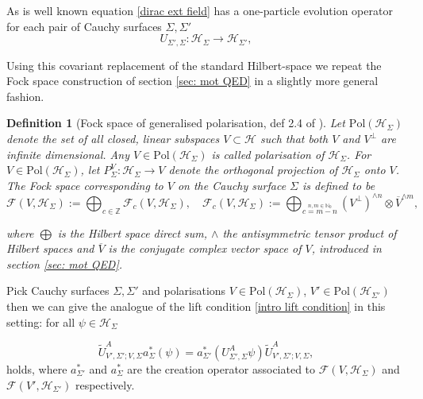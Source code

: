 \documentclass[b5paper,draft,openbib,12pt]{memoir}
\newtheorem{Def}{Definition}
\begin{document}
As is well known equation \eqref{dirac ext field} has a 
one-particle evolution operator for each pair of Cauchy surfaces \(\Sigma, \Sigma'\)
\begin{equation}
U_{\Sigma',\Sigma}:\mathcal{H}_\Sigma \rightarrow \mathcal{H}_{\Sigma'},
\end{equation}

Using this covariant replacement of the standard Hilbert-space we 
repeat the Fock space construction of section \ref{sec: mot QED} 
in a slightly more general fashion.

\begin{Def}[Fock space of generalised polarisation, def 2.4 of \cite{deckert2016perspective}]
  Let \(\text{Pol} (\mathcal{H}_\Sigma)\) denote the set of all 
  closed, linear subspaces \(V\subset \mathcal{H}\)
  such that both \(V\) and \(V^\perp\) are infinite dimensional. 
  Any \(V\in \text{Pol}(\mathcal{H}_\Sigma)\) is called 
  \emph{polarisation} of \(\mathcal{H}_\Sigma\). For 
  \(V\in \text{Pol}(\mathcal{H}_\Sigma)\), let 
  \(P_\Sigma^V:\mathcal{H}_{\Sigma}\rightarrow V\) 
  denote the orthogonal projection of \(\mathcal{H}_\Sigma\) onto 
  \(V\).
  The Fock space corresponding to \(V\) on the Cauchy surface 
  \(\Sigma\) is defined to be
  \begin{equation}
  \mathcal{F}(V,\mathcal{H}_\Sigma) := \bigoplus_{c\in\mathbb{Z}} \mathcal{F}_c (V,\mathcal{H}_\Sigma), \quad 
  \mathcal{F}_c(V,\mathcal{H}_\Sigma):= \bigoplus_{\overset{n,m\in\mathbb{N}_0}{c=m-n}}(V^\perp)^{\wedge n} \otimes \overline{V}^{\wedge m},
  \end{equation}
  
  where \(\bigoplus\) is the Hilbert space direct sum, \(\wedge\) 
  the antisymmetric tensor product of Hilbert spaces and 
  \(\overline{V}\) is the conjugate complex vector space of 
  \(V\), introduced in section \ref{sec: mot QED}.
\end{Def}

Pick Cauchy surfaces \(\Sigma, \Sigma'\) and polarisations 
\(V\in \text{Pol}(\mathcal{H}_\Sigma) \),
\(V'\in \text{Pol}(\mathcal{H}_{\Sigma'}) \)
then we can 
give the analogue of the lift condition  
\eqref{intro lift condition} in 
this setting: for all \(\psi \in \mathcal{H}_{\Sigma}\)

\begin{equation}\label{lift condition creation}
  \tilde{U}^A_{V',\Sigma'; V,\Sigma} a_\Sigma^*(\psi)
  =a^*_{\Sigma'}(U^A_{\Sigma',\Sigma}\psi )\tilde{U}^A_{V',\Sigma';V,\Sigma},
\end{equation}
holds, where \(a^*_{\Sigma'}\) and \(a^*_{\Sigma}\) are the 
creation operator associated to 
\(\mathcal{F}(V,\mathcal{H}_{\Sigma})\) and 
\(\mathcal{F}(V',\mathcal{H}_{\Sigma'})\) respectively. 
\end{document}
